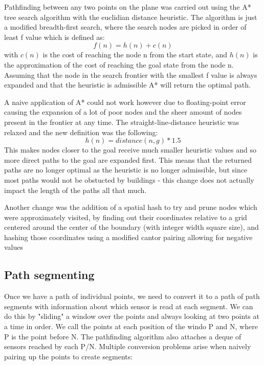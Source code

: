 \documentclass[10pt,a4paper]{article}
\begin{document}
Pathfinding between any two points on the plane was carried out using the A* tree search algorithm with the euclidian distance heuristic. 
The algorithm is just a modified breadth-first search, where the search nodes are picked in order of least f value which is defined as:
\begin{equation}
    f(n) = h(n) + c(n)
\end{equation}
with $c(n)$ is the cost of reaching the node n from the start state, and $h(n)$ is the approximation of the cost of reaching the goal state from the node n.
Assuming that the node in the search frontier with the smallest f value is always expanded and that the heuristic is admissible A* will return the optimal path.

A naive application of A* could not work however due to floating-point error causing the expansion of a lot of poor nodes and the sheer amount of nodes present in the frontier at any time. 
The straight-line-distance heuristic was relaxed and the new definition was the following:
\begin{equation}
    h(n) = distance(n,g) * 1.5
\end{equation}
This makes nodes closer to the goal receive much smaller heuristic values and so more direct paths to the goal are expanded first. 
This means that the returned paths are no longer optimal as the heuristic is no longer admissible, but since most paths would not be obstucted by buildings - this
change does not actually impact the length of the paths all that much.

Another change was the addition of a spatial hash to try and prune nodes which were approximately visited, by finding out 
their coordinates relative to a grid centered around the center of the boundary (with integer width square size), and hashing those coordinates
using a modified cantor pairing allowing for negative values

\subsection{Path segmenting}
Once we have a path of individual points, we need to convert it to a path of path segments with information about which sensor is read at each segment.
We can do this by "sliding" a window over the points and always looking at two points at a time in order. 
We call the points at each position of the windo P and N, where P is the point before N. 
The pathfinding algorithm also attaches a deque of sensors reached by each P/N.  
Multiple conversion problems arise when naively pairing up the points to create segments:
\end{document}

